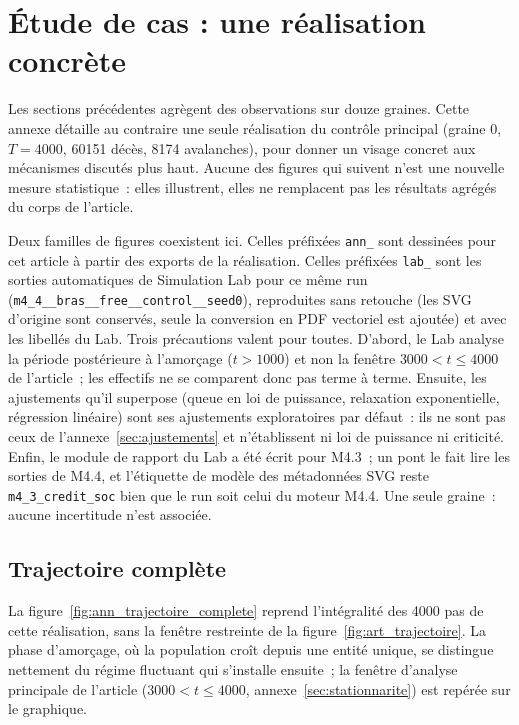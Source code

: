 \appendix
\FloatBarrier
\onecolumn

\twocolumn
\clearpage
\section{Étude de cas : une réalisation concrète}\label{sec:etude_cas}
Les sections précédentes agrègent des observations sur douze graines.
Cette annexe détaille au contraire une seule réalisation du contrôle
principal (graine 0, $T=4000$, 60151 décès, 8174 avalanches), pour
donner un visage concret aux mécanismes discutés plus haut. Aucune des
figures qui suivent n'est une nouvelle mesure statistique~: elles
illustrent, elles ne remplacent pas les résultats agrégés du corps de
l'article.

Deux familles de figures coexistent ici. Celles préfixées \texttt{ann\_}
sont dessinées pour cet article à partir des exports de la réalisation.
Celles préfixées \texttt{lab\_} sont les sorties automatiques de
Simulation Lab pour ce même run (\texttt{m4\_4\_\allowbreak\_bras\_\allowbreak\_free\_\allowbreak\_control\_\allowbreak\_seed0}), reproduites sans retouche
(les SVG d'origine sont conservés, seule la conversion en PDF vectoriel
est ajoutée) et avec les libellés du Lab. Trois précautions valent pour
toutes. D'abord, le Lab analyse la période postérieure à l'amorçage
($t>1000$) et non la fenêtre $3000<t\le4000$ de l'article~; les
effectifs ne se comparent donc pas terme à terme. Ensuite, les
ajustements qu'il superpose (queue en loi de puissance, relaxation
exponentielle, régression linéaire) sont ses ajustements exploratoires
par défaut~: ils ne sont pas ceux de l'annexe~\ref{sec:ajustements} et
n'établissent ni loi de puissance ni criticité. Enfin, le module de
rapport du Lab a été écrit pour M4.3~; un pont le fait lire les sorties
de M4.4, et l'étiquette de modèle des métadonnées SVG reste
\texttt{m4\_3\_credit\_soc} bien que le run soit celui du moteur M4.4.
Une seule graine~: aucune incertitude n'est associée.

\subsection{Trajectoire complète}
La figure~\ref{fig:ann_trajectoire_complete} reprend l'intégralité des
4000 pas de cette réalisation, sans la fenêtre restreinte de la
figure~\ref{fig:art_trajectoire}. La phase d'amorçage, où la population
croît depuis une entité unique, se distingue nettement du régime
fluctuant qui s'installe ensuite~; la fenêtre d'analyse principale de
l'article ($3000<t\le4000$, annexe~\ref{sec:stationnarite}) est repérée
sur le graphique.

